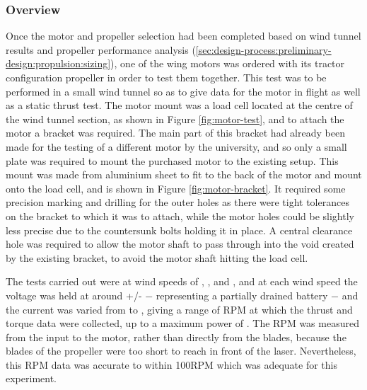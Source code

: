 \documentclass[../../main.tex]{subfiles}
\begin{document}
\subsubsection{Overview} \label{sec:design-process:interim-design-review:motor-and-propellor-test:overview}


Once the motor and propeller selection had been completed based on wind tunnel results and propeller performance analysis (\ref{sec:design-process:preliminary-design:propulsion:sizing}), one of the wing motors was ordered with its tractor configuration propeller in order to test them together.
This test was to be performed in a small wind tunnel so as to give data for the motor in flight as well as a static thrust test.
The motor mount was a load cell located at the centre of the wind tunnel section, as shown in Figure \ref{fig:motor-test}, and to attach the motor a bracket was required.
The main part of this bracket had already been made for the testing of a different motor by the university, and so only a small plate was required to mount the purchased motor to the existing setup.
This mount was made from aluminium sheet to fit to the back of the motor and mount onto the load cell, and is shown in Figure \ref{fig:motor-bracket}.
It required some precision marking and drilling for the outer holes as there were tight tolerances on the bracket to which it was to attach, while the motor holes could be slightly less precise due to the countersunk bolts holding it in place.
A central clearance hole was required to allow the motor shaft to pass through into the void created by the existing bracket, to avoid the motor shaft hitting the load cell.

The tests carried out were at wind speeds of , , and , and at each wind speed the voltage was held at around  +/-  $-$ representing a partially drained battery $-$ and the current was varied from  to , giving a range of RPM at which the thrust and torque data were collected, up to a maximum power of .
The RPM was measured from the input to the motor, rather than directly from the blades, because the blades of the propeller were too short to reach in front of the laser.
Nevertheless, this RPM data was accurate to within 100RPM which was adequate for this experiment.
\end{document}
